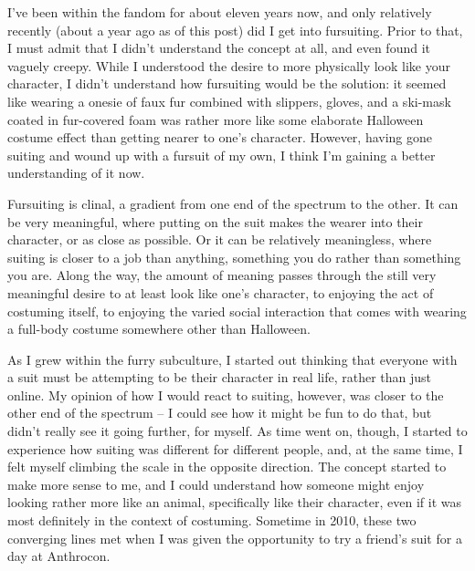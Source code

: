 
I've been within the fandom for about eleven years now, and only relatively recently (about a year ago as of this post) did I get into fursuiting.  Prior to that, I must admit that I didn't understand the concept at all, and even found it vaguely creepy.  While I understood the desire to more physically look like your character, I didn't understand how fursuiting would be the solution: it seemed like wearing a onesie of faux fur combined with slippers, gloves, and a ski-mask coated in fur-covered foam was rather more like some elaborate Halloween costume effect than getting nearer to one's character.  However, having gone suiting and wound up with a fursuit of my own, I think I'm gaining a better understanding of it now.

Fursuiting is clinal, a gradient from one end of the spectrum to the other.  It can be very meaningful, where putting on the suit makes the wearer into their character, or as close as possible. Or it can be relatively meaningless, where suiting is closer to a job than anything, something you do rather than something you are.  Along the way, the amount of meaning passes through the still very meaningful desire to at least look like one's character, to enjoying the act of costuming itself, to enjoying the varied social interaction that comes with wearing a full-body costume somewhere other than Halloween.

As I grew within the furry subculture, I started out thinking that everyone with a suit must be attempting to be their character in real life, rather than just online.  My opinion of how I would react to suiting, however, was closer to the other end of the spectrum -- I could see how it might be fun to do that, but didn't really see it going further, for myself.  As time went on, though, I started to experience how suiting was different for different people, and, at the same time, I felt myself climbing the scale in the opposite direction.  The concept started to make more sense to me, and I could understand how someone might enjoy looking rather more like an animal, specifically like their character, even if it was most definitely in the context of costuming.  Sometime in 2010, these two converging lines met when I was given the opportunity to try a friend's suit for a day at Anthrocon.

